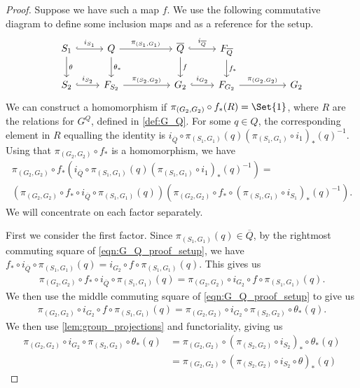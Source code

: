 \begin{proof}
	Suppose we have such a map $f$.
	We use the following commutative diagram to define some inclusion maps and as a reference for the setup.
	\begin{equation}
		\begin{tikzcd}
			S_1 \ar[d, "\theta"] \ar[r, hook, "i_{S_1}"] & Q \ar[d, "\theta_*"] \ar[rr, "\pi_{(S_1, G_1)}"] & & \overline{Q} \ar[d, "f"] \ar[r, hook, "i_{\overline{Q}}"] & F_{\overline{Q}} \ar[d, "f_*"]
			\\ S_2 \ar[r, hook, "i_{S_2}"] & F_{S_2} \ar[rr, "\pi_{(S_2, G_2)}"] & & G_2 \ar[r, hook, "i_{G_2}"] & F_{G_2} \ar[rr, "\pi_{(G_2, G_2)}"] & & G_2
		\end{tikzcd}
		\label{eqn:G_Q_proof_setup}
	\end{equation}
	We can construct a homomorphism if $\pi_{(G_2, G_2)} \circ f_*(R) = \Set{1}$, where $R$ are the relations for $G^Q$, defined in \cref{def:G_Q}.
	For some $q \in Q$, the corresponding element in $R$ equalling the identity is  $i_{\overline{Q}} \circ \pi_{(S_1,G_1)}(q)(\pi_{(S_1,G_1)} \circ i_1)_*(q)^{-1}$.
	Using that $\pi_{(G_2,G_2)} \circ f_*$ is a homomorphism, we have
	\begin{align*}
		\pi_{(G_2,G_2)} \circ f_* \left(i_{\overline{Q}} \circ \pi_{(S_1,G_1)}(q)(\pi_{(S_1,G_1)} \circ i_1)_*(q)^{-1}\right) =
		\\ \left(\pi_{(G_2,G_2)} \circ f_* \circ i_{\overline{Q}} \circ \pi_{(S_1,G_1)} (q)\right) \left( \pi_{(G_2,G_2)} \circ f_* \circ\left( \pi_{(S_1,G_1)} \circ i_{S_1}\right)_*(q)^{-1} \right).
	\end{align*}
	We will concentrate on each factor separately.

	First we consider the first factor.
	Since $\pi_{(S_1, G_1)}(q) \in \overline{Q}$, by the rightmost commuting square of \eqref{eqn:G_Q_proof_setup}, we have $f_* \circ i_{\overline{Q}} \circ \pi_{(S_1, G_1)}(q) = i_{G_2} \circ f \circ \pi_{(S_1,G_1)} (q)$.
	This gives us
	\begin{align*}
		\pi_{(G_2,G_2)} \circ f_* \circ i_{\overline{Q}} \circ \pi_{(S_1,G_1)} (q) = \pi_{(G_2,G_2)} \circ i_{G_2} \circ f \circ \pi_{(S_1,G_1)}(q).
	\end{align*}
	We then use the middle commuting square of \eqref{eqn:G_Q_proof_setup} to give us
	\begin{align*}
		\pi_{(G_2,G_2)} \circ i_{G_2} \circ f \circ \pi_{(S_1,G_1)}(q) = \pi_{(G_2,G_2)} \circ i_{G_2} \circ \pi_{(S_2,G_2)} \circ \theta_*(q).
	\end{align*}
	We then use \cref{lem:group_projections} and functoriality, giving us
	\begin{align*}
		\pi_{(G_2,G_2)} \circ i_{G_2} \circ \pi_{(S_2,G_2)} \circ \theta_*(q) & = \pi_{(G_2,G_2)} \circ \left( \pi_{(S_2,G_2)} \circ i_{S_2} \right)_*  \circ \theta_*(q)
		\\ &= \pi_{(G_2,G_2)} \circ \left( \pi_{(S_2,G_2)} \circ i_{S_2} \circ \theta \right)_*(q)
	\end{align*}


\end{proof}
